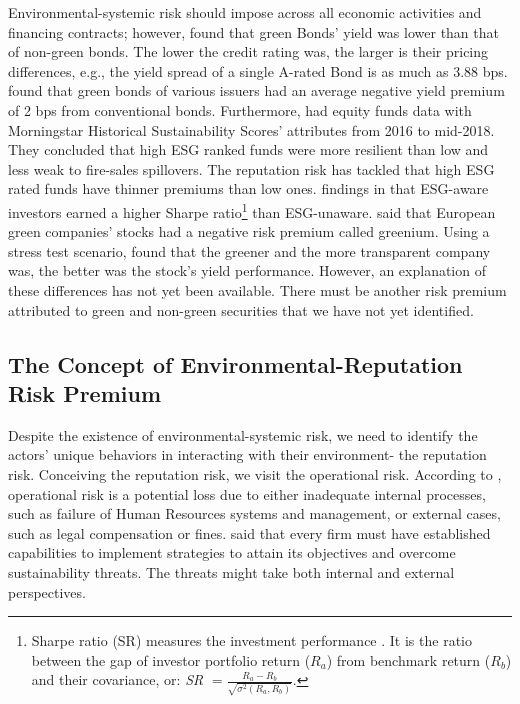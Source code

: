 \documentclass[sn-basic]{sn-jnl}%
\theoremstyle{thmstyleone}%
\theoremstyle{thmstyletwo}%
\theoremstyle{thmstylethree}%
\begin{document}
Environmental-systemic risk should impose across all economic activities and financing contracts; however, \citet{hachenberg2018green} found that green Bonds’ yield was lower than that of non-green bonds. The lower the credit rating was, the larger is their pricing differences, e.g., the yield spread of a single A-rated Bond is as much as 3.88 bps. \citet{zerbib2019effect} found that green bonds of various issuers had an average negative yield premium of 2 bps from conventional bonds. Furthermore, \citet{cerqueti2021esg} had equity funds data with Morningstar Historical Sustainability Scores’ attributes from 2016 to mid-2018. They concluded that high ESG ranked funds were more resilient than low and less weak to fire-sales spillovers. The reputation risk has tackled that high ESG rated funds have thinner premiums than low ones. \citeauthor{pedersen2020responsible} findings in \citeyear{pedersen2020responsible} that ESG-aware investors earned a higher Sharpe ratio\footnote{Sharpe ratio (SR) measures the investment performance \citep{sharpe1964equilibrium}. It is the ratio between the gap of investor portfolio return ($R_a$) from benchmark return ($R_b$) and their covariance, or: \emph{SR} $=\frac{R_a-R_b}{\sqrt{\sigma^2\left(R_a,R_b\right)}}$.} than ESG-unaware. \citet{alessi2021greenium} said that European green companies’ stocks had a negative risk premium called greenium. Using a stress test scenario, \citeauthor{alessi2021greenium} found that the greener and the more transparent company was, the better was the stock’s yield performance. However, an explanation of these differences has not yet been available. There must be another risk premium attributed to green and non-green securities that we have not yet identified.

\subsection{The Concept of Environmental-Reputation Risk Premium}
Despite the existence of environmental-systemic risk, we need to identify the actors' unique behaviors in interacting with their environment- the reputation risk. Conceiving the reputation risk, we visit the operational risk. According to \citet{solvency2007glossary}, operational risk is a potential loss due to either inadequate internal processes, such as failure of Human Resources systems and management, or external cases, such as legal compensation or fines. \cite{radomska2014operational} said that every firm must have established capabilities to implement strategies to attain its objectives and overcome sustainability threats. The threats might take both internal and external perspectives.
\end{document}
